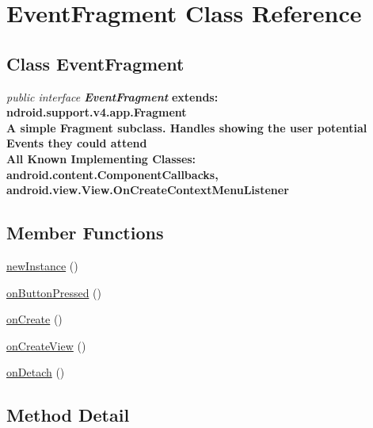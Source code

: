 \hypertarget{class_EventFragment.Android}{\section{EventFragment Class Reference}
\label{class_EventFragment.Android}
}

\subsection*{Class EventFragment}

\textit{public interface \textbf{EventFragment}}
	\bf{extends:}\\
	\tab ndroid.support.v4.app.Fragment\\

A simple Fragment subclass. Handles showing the user potential Events they could attend\\

\textbf{All Known Implementing Classes:}\\
\tab     android.content.ComponentCallbacks, android.view.View.OnCreateContextMenuListener\\



\subsection*{Member Functions}
\begin{DoxyCompactItemize}
\item 
\hyperlink{class_EventFragment.Android.newInstance}{newInstance} ()
\item 
\hyperlink{class_EventFragment.Android.onButtonPressed}{onButtonPressed} ()
\item 
\hyperlink{class_EventFragment.Android.onCreate}{onCreate} ()
\item 
\hyperlink{class_EventFragment.Android.onCreateView}{onCreateView} ()
\item 
\hyperlink{class_EventFragment.Android.onDetach}{onDetach} ()

\end{DoxyCompactItemize}




\subsection{Method Detail}

